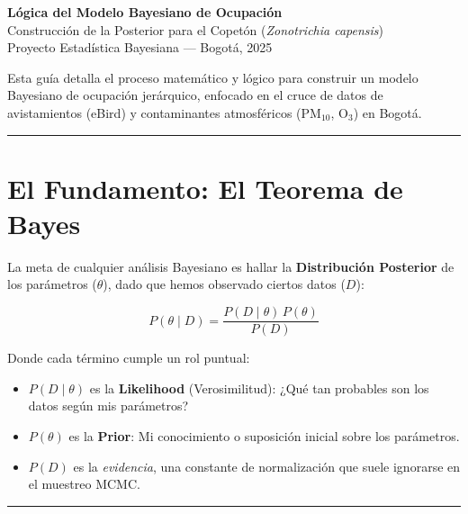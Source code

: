 \documentclass[12pt, a4paper]{article}
\begin{document}
\begin{center}
  {\LARGE\bfseries\color{bayesblue} Lógica del Modelo Bayesiano de Ocupación}\\[0.5em]
  {\large Construcción de la Posterior para el Copetón (\textit{Zonotrichia capensis})}\\[0.3em]
  {\small Proyecto Estadística Bayesiana --- Bogotá, 2025}
\end{center}

\vspace{0.5em}
\noindent Esta guía detalla el proceso matemático y lógico para construir un modelo Bayesiano de ocupación jerárquico, enfocado en el cruce de datos de avistamientos (eBird) y contaminantes atmosféricos ($\text{PM}_{10}$, $\text{O}_3$) en Bogotá.

\hrule
\vspace{1em}

\section{El Fundamento: El Teorema de Bayes}

La meta de cualquier análisis Bayesiano es hallar la \textbf{Distribución Posterior} de los parámetros ($\theta$), dado que hemos observado ciertos datos ($D$):

\begin{equation}
  P(\theta \mid D) = \frac{P(D \mid \theta)\, P(\theta)}{P(D)}
\end{equation}

Donde cada término cumple un rol puntual:

\begin{itemize}
  \item $P(D \mid \theta)$ es la \textbf{Likelihood} (Verosimilitud): ¿Qué tan probables son los datos según mis parámetros?
  \item $P(\theta)$ es la \textbf{Prior}: Mi conocimiento o suposición inicial sobre los parámetros.
  \item $P(D)$ es la \textit{evidencia}, una constante de normalización que suele ignorarse en el muestreo MCMC.
\end{itemize}

\hrule
\vspace{1em}
\end{document}
